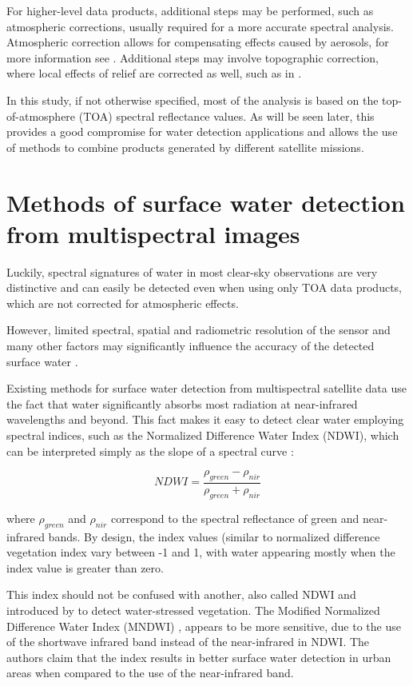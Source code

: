 For higher-level data products, additional steps may be performed, such as atmospheric corrections, usually required for a more accurate spectral analysis. Atmospheric correction allows for compensating effects caused by aerosols, for more information see \citet{gao2006review}. Additional steps may involve topographic correction, where local effects of relief are corrected as well, such as in \citet{Tan2013}.

In this study, if not otherwise specified, most of the analysis is based on the top-of-atmosphere (TOA) spectral reflectance values. As will be seen later, this provides a good compromise for water detection applications and allows the use of methods to combine products generated by different satellite missions. 

\section{Methods of surface water detection from multispectral images}

Luckily, spectral signatures of water in most clear-sky observations are very distinctive and can easily be detected even when using only TOA data products, which are not corrected for atmospheric effects.

However, limited spectral, spatial and radiometric resolution of the sensor and many other factors may significantly influence the accuracy of the detected surface water \citet{Ji2009}. 

Existing methods for surface water detection from multispectral satellite data use the fact that water significantly absorbs most radiation at near-infrared wavelengths and beyond. This fact makes it easy to detect clear water employing spectral indices, such as the Normalized Difference Water Index (NDWI), which can be interpreted simply as the slope of a spectral curve \citet{McFeeters1996}:

\begin{equation}
NDWI =  \frac{\rho_{green} - \rho_{nir}}{\rho_{green} + \rho_{nir}} 
\label{eq:index_NDWI}
\end{equation}

where $\rho_{green}$ and $\rho_{nir}$ correspond to the spectral reflectance of green and near-infrared bands. By design, the index values (similar to normalized difference vegetation index \citet{rouse1974monitoring} vary between -1 and 1, with water appearing mostly when the index value is greater than zero.

This index should not be confused with another, also called NDWI and introduced by \citet{Gao1996} to detect water-stressed vegetation. The Modified Normalized Difference Water Index (MNDWI) \citet{Xu2006}, appears to be more sensitive, due to the use of the shortwave infrared band instead of the near-infrared in NDWI. The authors claim that the index results in better surface water detection in urban areas when compared to the use of the near-infrared band.

